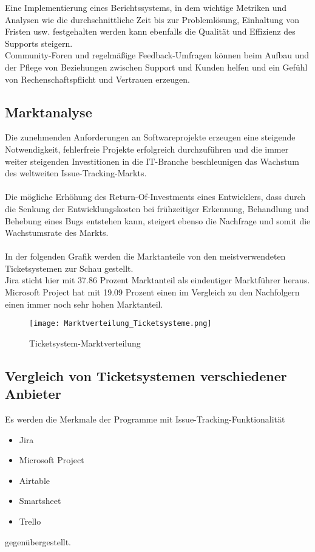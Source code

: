 Eine Implementierung eines Berichtssystems, in dem wichtige Metriken und Analysen wie die durchschnittliche Zeit bis zur Problemlösung, Einhaltung von Fristen usw. festgehalten werden kann ebenfalls die Qualität und Effizienz des Supports steigern. \\
Community-Foren und regelmäßige Feedback-Umfragen können beim Aufbau und der Pflege von Beziehungen zwischen Support und Kunden helfen und ein Gefühl von Rechenschaftspflicht und Vertrauen erzeugen.
\subsection{Marktanalyse}  
Die zunehmenden Anforderungen an Softwareprojekte erzeugen eine steigende Notwendigkeit, fehlerfreie Projekte erfolgreich durchzuführen und die immer weiter steigenden Investitionen in die IT-Branche beschleunigen das Wachstum des weltweiten Issue-Tracking-Markts. \\\\
Die mögliche Erhöhung des Return-Of-Investments eines Entwicklers, dass durch die Senkung der Entwicklungskosten bei frühzeitiger Erkennung, Behandlung und Behebung eines Bugs entstehen kann, steigert ebenso die Nachfrage und somit die Wachstumsrate des Markts. \\\\
In der folgenden Grafik werden die Marktanteile von den meistverwendeten Ticketsystemen zur Schau gestellt. \\
Jira sticht hier mit 37.86 Prozent Marktanteil als eindeutiger Marktführer heraus. Microsoft Project hat mit 19.09 Prozent einen im Vergleich zu den Nachfolgern einen immer noch sehr hohen Marktanteil.
\begin{figure}[H]
 	\centering
    \texttt{[image: Marktverteilung\_Ticketsysteme.png]}
	\caption{Ticketsystem-Marktverteilung}
\end{figure}   
\subsection{Vergleich von Ticketsystemen verschiedener Anbieter}
Es werden die Merkmale der Programme mit Issue-Tracking-Funktionalität
		\begin{itemize}
			\item Jira
			\item Microsoft Project
			\item Airtable
			\item Smartsheet
			\item Trello
		\end{itemize}
gegenübergestellt.   

